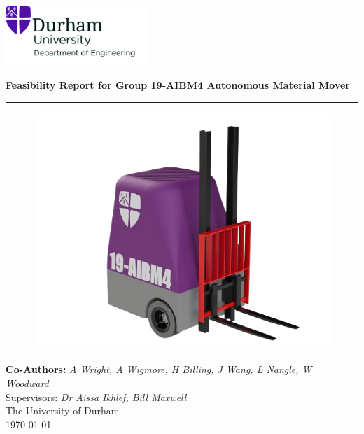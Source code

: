 \documentclass[12pt]{article}
\begin{document}



 
\begin{titlepage}
\centering
\includegraphics[width=0.4\textwidth]{UoD_Engineering.jpg} \\
\vspace{10mm}

{\LARGE \textbf{Feasibility Report for Group 19-AIBM4 Autonomous Material Mover}} \\[10pt]

\vspace{5mm}\hrule\vspace{0mm}

\begin{figure}[h!]
    \centering
     \includegraphics[width=1\textwidth]{Pooled_Design_V2__6_-removebg-preview.png}
\end{figure}  
\vspace{0mm}
\vspace{10mm}

{\large \textbf{Co-Authors: }\textit{A Wright, A Wigmore, H Billing, J Wang, L Nangle, W Woodward}} \\ \vspace{1mm}
{Supervisors:\textit{ Dr Aissa Ikhlef, Bill Maxwell}} \\[10pt]
{\small The University of Durham \\ \today}
\end{titlepage}
\end{document}
